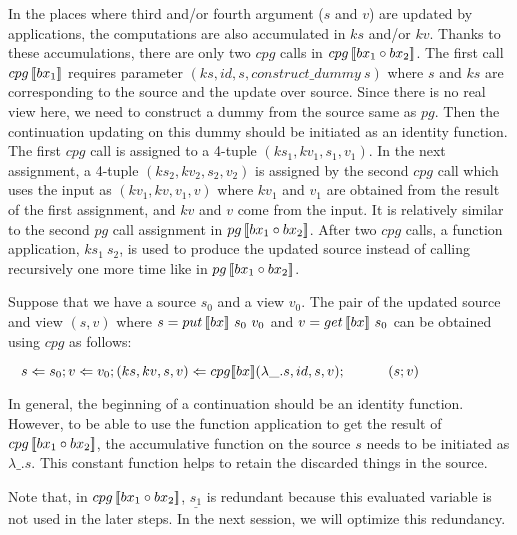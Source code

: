 In the places where third and/or fourth argument ($s$ and $v$) are updated by applications, the computations are also accumulated in $ks$ and/or $kv$.
Thanks to these accumulations, there are only two $cpg$ calls in $cpg \, [\![bx_1 \circ bx_2]\!]$. The first call $cpg \, [\![bx_1]\!]$ requires parameter $(ks, id, s, construct\_dummy \ s)$ where $s$ and $ks$ are corresponding to the source and the update over source. Since there is no real view here, we need to construct a dummy from the source same as $pg$. Then the continuation updating on this dummy should be initiated as an identity function. The first $cpg$ call is assigned to a 4-tuple $(ks_1, kv_1, s_1, v_1)$. In the next assignment, a 4-tuple $(ks_2, kv_2, s_2, v_2)$ is assigned by the second $cpg$ call which uses the input as $(kv_1, kv, v_1, v)$ where $kv_1$ and $v_1$ are obtained from the result of the first assignment, and $kv$ and $v$ come from the input. It is relatively similar to the second $pg$ call assignment in $pg \, [\![bx_1 \circ bx_2]\!]$. After two $cpg$ calls, a function application, $ks_1 \ s_2$, is used to produce the updated source instead of calling recursively one more time like in $pg \, [\![bx_1 \circ bx_2]\!]$.

Suppose that we have a source $s_0$ and a view $v_0$. The pair of the updated source and view $(s, v)$ where $s = put \, [\![bx]\!] \ s_0 \ v_0$ and $v = get \, [\![bx]\!] \ s_0$ can be obtained using $cpg$ as follows:

\smallvspace
    $\tab s \Leftarrow s_0; v \Leftarrow v_0; (ks, kv, s, v) \Leftarrow \cpg{bx}{\lambda \_.s}{id}{s}{v};\\
        \tab \qtab (s; v)$
\smallvspace
        
In general, the beginning of a continuation should be an identity function. However, to be able to use the function application to get the result of $cpg \, [\![bx_1 \circ bx_2]\!]$, the accumulative function on the source $s$ needs to be initiated as $\lambda \_.s$. This constant function helps to retain the discarded things in the source.



Note that, in $cpg \, [\![bx_1 \circ bx_2]\!]$, $\underline{s_1}$ is redundant because this evaluated variable is not used in the later steps.
In the next session, we will optimize this redundancy.


